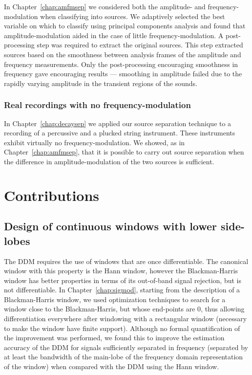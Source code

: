 In Chapter~\ref{chap:amfmsep} we considered both the amplitude- and
frequency-modulation when classifying into sources. We adaptively selected the
best variable on which to classify using principal components analysis and found
that amplitude-modulation aided in the case of little frequency-modulation. A
post-processing step was required to extract the original sources. This step
extracted sources based on the smoothness between analysis frames of the
amplitude and frequency measurements.  Only the post-processing encouraging
smoothness in frequency gave encouraging results --- smoothing in amplitude
failed due to the rapidly varying amplitude in the transient regions of the
sounds.

\subsubsection{Real recordings with no
frequency-modulation}

In Chapter~\ref{chap:decaysep} we applied our source separation technique
to a recording of a percussive and a plucked string instrument. These
instruments exhibit virtually no frequency-modulation. We showed, as in
Chapter~\ref{chap:amfmsep}, that it is
possible to carry out source separation when the difference in
amplitude-modulation of the two sources is sufficient. 

\section{Contributions}

\subsection{Design of continuous windows with lower side-lobes}

The DDM requires the use of windows that are once differentiable. The canonical
window with this property is the Hann window, however the Blackman-Harris window
has better properties in terms of its out-of-band signal rejection, but is not
differentiable. In
Chapter~\ref{chap:sigmod}, starting
from the description of a Blackman-Harris window, we used optimization
techniques to search for a window close to the Blackman-Harris, but whose
end-points are 0, thus allowing differentiation everywhere after windowing with
a rectangular window (necessary to make the window have finite support).
Although no formal quantification of the improvement was performed, we found
this to improve the estimation accuracy of the DDM for signals sufficiently
separated in frequency (separated by at least the bandwidth of the main-lobe of
the frequency domain representation of the window) when compared with the DDM
using the Hann window.

